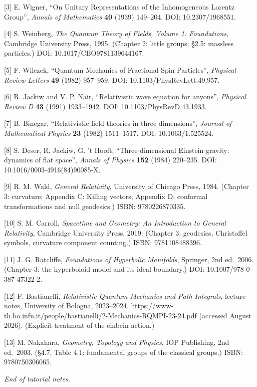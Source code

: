 \documentclass[
]{article}
\begin{document}
{[}3{]} E. Wigner, ``On Unitary Representations of the Inhomogeneous
Lorentz Group'', \emph{Annals of Mathematics} \textbf{40} (1939)
149--204. DOI: 10.2307/1968551.

{[}4{]} S. Weinberg, \emph{The Quantum Theory of Fields, Volume 1:
Foundations}, Cambridge University Press, 1995. (Chapter 2: little
groups; §2.5: massless particles.) DOI: 10.1017/CBO9781139644167.

{[}5{]} F. Wilczek, ``Quantum Mechanics of Fractional-Spin Particles'',
\emph{Physical Review Letters} \textbf{49} (1982) 957--959. DOI:
10.1103/PhysRevLett.49.957.

{[}6{]} R. Jackiw and V. P. Nair, ``Relativistic wave equation for
anyons'', \emph{Physical Review D} \textbf{43} (1991) 1933--1942. DOI:
10.1103/PhysRevD.43.1933.

{[}7{]} B. Binegar, ``Relativistic field theories in three dimensions'',
\emph{Journal of Mathematical Physics} \textbf{23} (1982) 1511--1517.
DOI: 10.1063/1.525524.

{[}8{]} S. Deser, R. Jackiw, G. 't Hooft, ``Three-dimensional Einstein
gravity: dynamics of flat space'', \emph{Annals of Physics} \textbf{152}
(1984) 220--235. DOI: 10.1016/0003-4916(84)90085-X.

{[}9{]} R. M. Wald, \emph{General Relativity}, University of Chicago
Press, 1984. (Chapter 3: curvature; Appendix C: Killing vectors;
Appendix D: conformal transformations and null geodesics.) ISBN:
9780226870335.

{[}10{]} S. M. Carroll, \emph{Spacetime and Geometry: An Introduction to
General Relativity}, Cambridge University Press, 2019. (Chapter 3:
geodesics, Christoffel symbols, curvature component counting.) ISBN:
9781108488396.

{[}11{]} J. G. Ratcliffe, \emph{Foundations of Hyperbolic Manifolds},
Springer, 2nd ed.~2006. (Chapter 3: the hyperboloid model and its ideal
boundary.) DOI: 10.1007/978-0-387-47322-2.

{[}12{]} F. Bastianelli, \emph{Relativistic Quantum Mechanics and Path
Integrals}, lecture notes, University of Bologna, 2023--2024.
https://www-th.bo.infn.it/people/bastianelli/2-Mechanics-RQMPI-23-24.pdf
(accessed August 2026). (Explicit treatment of the einbein action.)

{[}13{]} M. Nakahara, \emph{Geometry, Topology and Physics}, IOP
Publishing, 2nd ed.~2003. (§4.7, Table 4.1: fundamental groups of the
classical groups.) ISBN: 9780750306065.

\emph{End of tutorial notes.}
\end{document}
